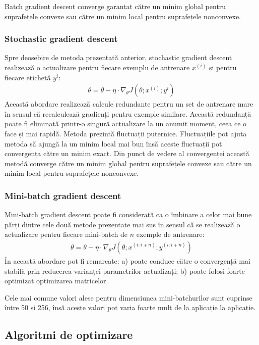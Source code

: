 Batch gradient descent converge garantat către un minim global pentru suprafețele convexe sau către un minim local pentru suprafețele nonconvexe.

\subsubsection{Stochastic gradient descent}
Spre deosebire de metoda prezentată anterior, stochastic gradient descent realizează o actualizare pentru fiecare exemplu de antrenare $x^{(i)}$ și pentru fiecare etichetă $y^{i}$:
\begin{align}
	\theta = \theta - \eta \cdot \nabla_{\theta}J(\theta;x^{(i)};y^{i})
\end{align}
Această abordare realizează calcule redundante pentru un set de antrenare mare în sensul că recalculează gradienți pentru exemple similare. Această redundanță poate fi eliminată printr-o singură actualizare la un anumit moment, ceea ce o face și mai rapidă. Metoda prezintă fluctuații puternice. Fluctuațiile pot ajuta metoda să ajungă la un minim local mai bun însă aceste fluctuații pot convergența către un minim exact. Din punct de vedere al convergenței această metodă converge către un minim global pentru suprafețele convexe sau către un minim local pentru suprafețele nonconvexe.

\subsubsection{Mini-batch gradient descent}
Mini-batch gradient descent poate fi considerată ca o îmbinare a celor mai bune părți dintre cele două metode prezentate mai sus în sensul că se realizează o actualizare pentru fiecare mini-batch de $n$ exemple de antrenare:
\begin{align}
	\theta = \theta - \eta \cdot \nabla_{\theta}J(\theta;x^{(i:i+n)};y^{(i:i+n)})
\end{align} 
În această abordare pot fi remarcate: a) poate conduce către o convergență mai stabilă prin reducerea varianței parametrilor actualizați; b) poate folosi foarte optimizat optimizarea matricelor.

Cele mai comune valori alese pentru dimensiunea mini-batchurilor sunt cuprinse între 50 și 256, însă aceste valori pot varia foarte mult de la aplicație la aplicație.

\subsection{Algoritmi de optimizare}
